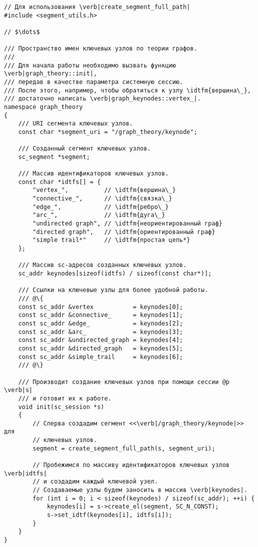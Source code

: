 \begin{lstlisting}[texcl]
// Для использования \verb|create_segment_full_path|
#include <segment_utils.h>

// $\dots$

/// Пространство имен ключевых узлов по теории графов.
///
/// Для начала работы необходимо вызвать функцию \verb|graph_theory::init|,
/// передав в качестве параметра системную сессию.
/// После этого, например, чтобы обратиться к узлу \idtfm{вершина\_},
/// достаточно написать \verb|graph_keynodes::vertex_|.
namespace graph_theory
{
    /// URI сегмента ключевых узлов.
    const char *segment_uri = "/graph_theory/keynode";

    /// Созданный сегмент ключевых узлов.
    sc_segment *segment;

    /// Массив идентификаторов ключевых узлов.
    const char *idtfs[] = {
        "vertex_",          // \idtfm{вершина\_}
        "connective_",      // \idtfm{связка\_}
        "edge_",            // \idtfm{ребро\_}
        "arc_",             // \idtfm{дуга\_}
        "undirected graph", // \idtfm{неориентированный граф}
        "directed graph",   // \idtfm{ориентированный граф}
        "simple trail*"     // \idtfm{простая цепь*}
    };

    /// Массив sc-адресов созданных ключевых узлов.
    sc_addr keynodes[sizeof(idtfs) / sizeof(const char*)];

    /// Ссылки на ключевые узлы для более удобной работы.
    /// @\{
    const sc_addr &vertex           = keynodes[0];
    const sc_addr &connective_      = keynodes[1];
    const sc_addr &edge_            = keynodes[2];
    const sc_addr &arc_             = keynodes[3];
    const sc_addr &undirected_graph = keynodes[4];
    const sc_addr &directed_graph   = keynodes[5];
    const sc_addr &simple_trail     = keynodes[6];
    /// @\}

    /// Производит создание ключевых узлов при помощи сессии @p \verb|s|
    /// и готовит их к работе.
    void init(sc_session *s)
    {
        // Сперва создадим сегмент <<\verb|/graph_theory/keynode|>> для
        // ключевых узлов.
        segment = create_segment_full_path(s, segment_uri);

        // Пробежимся по массиву идентификаторов ключевых узлов \verb|idtfs|
        // и создадим каждый ключевой узел.
        // Создаваемые узлы будем заносить в массив \verb|keynodes|.
        for (int i = 0; i < sizeof(keynodes) / sizeof(sc_addr); ++i) {
            keynodes[i] = s->create_el(segment, SC_N_CONST);
            s->set_idtf(keynodes[i], idtfs[i]);
        }
    }
}
\end{lstlisting}


